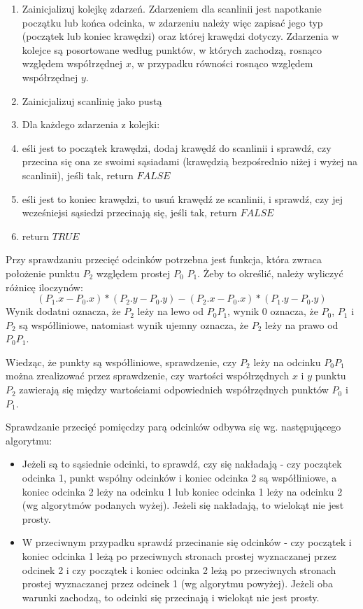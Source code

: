\documentclass{article}
\newcommand{\tab}[1]{\hspace{.05\textwidth}\rlap{#1}}
\begin{document}
\begin{enumerate}
    \item Zainicjalizuj kolejkę zdarzeń. Zdarzeniem dla scanlinii jest napotkanie początku lub końca odcinka, w zdarzeniu należy więc zapisać jego typ (początek lub koniec krawędzi) oraz której krawędzi dotyczy. Zdarzenia w kolejce są posortowane według punktów, w których zachodzą, rosnąco względem współrzędnej $x$, w przypadku równości rosnąco względem współrzędnej $y$.
    
    \item Zainicjalizuj scanlinię jako pustą
    
    \item Dla każdego zdarzenia z kolejki:
    
    \item \tab jeśli jest to początek krawędzi, dodaj krawędź do scanlinii i sprawdź, czy przecina się ona ze swoimi sąsiadami (krawędzią bezpośrednio niżej i wyżej na scanlinii), jeśli tak, return $FALSE$
    
    \item \tab jeśli jest to koniec krawędzi, to usuń krawędź ze scanlinii, i sprawdź, czy jej wcześniejsi sąsiedzi przecinają się, jeśli tak, return $FALSE$
    
    \item return $TRUE$
\end{enumerate}

Przy sprawdzaniu przecięć odcinków potrzebna jest funkcja, która zwraca położenie punktu $P_2$ względem prostej $P_0$ $P_1$. Żeby to określić, należy wyliczyć różnicę iloczynów:
$$ (P_1.x - P_0.x)*(P_2.y - P_0.y) - (P_2.x - P_0.x)*(P_1.y -  P_0.y) $$
Wynik dodatni oznacza, że $P_2$ leży na lewo od $P_0P_1$, wynik 0 oznacza, że $P_0$, $P_1$ i $P_2$ są współliniowe, natomiast wynik ujemny oznacza, że $P_2$ leży na prawo od $P_0P_1$.

Wiedząc, że punkty są współliniowe, sprawdzenie, czy $P_2$ leży na odcinku $P_0P_1$ można zrealizować przez sprawdzenie, czy wartości współrzędnych $x$ i $y$ punktu $P_2$ zawierają się między wartościami odpowiednich współrzędnych punktów $P_0$ i $P_1$. 

Sprawdzanie przecięć pomięcdzy parą odcinków odbywa się wg. następującego algorytmu:

\begin{itemize}
    \item Jeżeli są to sąsiednie odcinki, to sprawdź, czy się nakładają - czy początek odcinka 1, punkt wspólny odcinków i koniec odcinka 2 są współliniowe, a koniec odcinka 2 leży na odcinku 1 lub koniec odcinka 1 leży na odcinku 2 (wg algorytmów podanych wyżej). Jeżeli się nakładają, to wielokąt nie jest prosty.
    \item W przeciwnym przypadku sprawdź przecinanie się odcinków - czy początek i koniec odcinka 1 leżą po przeciwnych stronach prostej wyznaczanej przez odcinek 2 i czy początek i koniec odcinka 2 leżą po przeciwnych stronach prostej wyznaczanej przez odcinek 1 (wg algorytmu powyżej). Jeżeli oba warunki zachodzą, to odcinki się przecinają i wielokąt nie jest prosty.
\end{itemize}
\end{document}
